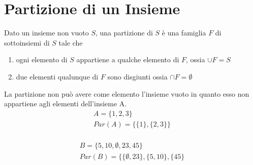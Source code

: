 \section{Partizione di un Insieme}
Dato un insieme non vuoto $S$, una partizione di $S$ è una famiglia $F$ di sottoinsiemi di $S$ tale che
\begin{enumerate}
    \item ogni elemento di $S$ appartiene a qualche elemento di $F$, ossia $\cup F = S$
    \item due elementi qualunque di $F$ sono disgiunti ossia $\cap F = \emptyset$
\end{enumerate}
La partizione non può avere come elemento l'insieme vuoto in quanto esso non
appartiene agli elementi dell'insieme A.
\begin{align*}
A = \{ 1,2,3 \}\\
Par(A) = \{ \{ 1 \},\{2,3 \} \}\\
\end{align*}

\begin{align*}
B = \{5,10,\emptyset,23,45\}\\
Par(B) = \{ \{\emptyset,23\}, \{5,10\},\{45\} \\
\end{align*}
